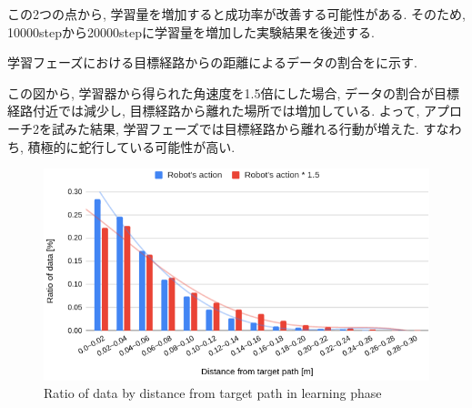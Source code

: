   この2つの点から, 学習量を増加すると成功率が改善する可能性がある. そのため, 10000stepから20000stepに学習量を増加した実験結果を後述する.

  \newpage


  学習フェーズにおける目標経路からの距離によるデータの割合をに示す. \par
  この図から, 学習器から得られた角速度を1.5倍にした場合, データの割合が目標経路付近では減少し, 目標経路から離れた場所では増加している. よって, アプローチ2を試みた結果, 学習フェーズでは目標経路から離れる行動が増えた. すなわち, 積極的に蛇行している可能性が高い.


  \begin{figure}[hbtp]
    \centering
   \includegraphics[keepaspectratio, scale=0.37]
        {images/hist_act_training2.png}
   \caption{Ratio of data by distance from target path in learning phase}
   \label{Fig:hist_act_training}
  \end{figure}  

